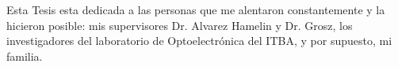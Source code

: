 \documentclass[12pt,twoside,openright]{moddalthesis}
\begin{document}
\begin{acknowledgements}
Esta Tesis esta dedicada a las personas que me alentaron constantemente y la hicieron posible: mis supervisores Dr. Alvarez Hamelin y Dr. Grosz, los investigadores del laboratorio de Optoelectrónica del ITBA, y por supuesto, mi familia.
\end{acknowledgements}



%

\listoffigures
{}



\afterpreface
\linespread{1.5}









\appendix
\cleardoublepage
%




\linespread{1.44}
%

%


%  
\end{document}
